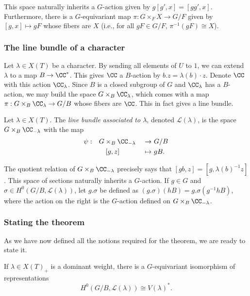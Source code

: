 This space naturally inherits a $G$-action given by $g [g', x] = [g g', x]$. Furthermore, there is a $G$-equivariant map $\pi: G \times_F X \to G/F$ given by $[g,x] \mapsto gF$ whose fibers are $X$ (i.e., for all $gF \in G/F$, $\pi^{-1}(gF) \cong X$).

\subsubsection{The line bundle of a character}
Let $\lambda \in X(T)$ be a character. By sending all elements of $U$ to $1$, we can extend $\lambda$ to a map $B \rightarrow \CC^*$. This gives $\CC$ a $B$-action by $b . z = \lambda(b) \cdot z$. Denote $\CC$ with this action $\CC_\lambda$. Since $B$ is a closed subgroup of $G$ and $\CC_\lambda$ has a $B$-action, we may build the space $G \times_B \CC_{\lambda}$, which comes with a map $\pi: G \times_B \CC_{\lambda} \to G/B$ whose fibers are $\CC$. This in fact gives a line bundle.
\begin{defn}
    Let $\lambda \in X(T)$. The \emph{line bundle associated to $\lambda$}, denoted $\mathcal{L}(\lambda)$, is the space $G \times_B \CC_{-\lambda}$ with the map
    \begin{alignat*}{4}
    \psi: \quad &G \times_B \CC_{-\lambda} &\ \to\ &G/B\\
           & \quad [g, z] &\ \mapsto\ &gB.
\end{alignat*}
\end{defn}

The quotient relation of $G \times_B \CC_{-\lambda}$ precisely says that $[g b, z] = [g, {\lambda(b)}^{-1} z]$.
This space of sections naturally inherits a $G$-action. If $g \in G$ and $\sigma \in H^{0}(G/B, \mathcal{L}(\lambda))$, let $g. \sigma$ be defined as $(g . \sigma) (h B) = g.\sigma(g^{-1}h B)$, where the action on the right is the $G$-action defined on $G \times_B \CC_{-\lambda}$. 

\subsubsection{Stating the theorem}
As we have now defined all the notions required for the theorem, we are ready to state it.

\begin{theorem}
    If $\lambda \in X(T)_+$ is a dominant weight, there is a $G$-equivariant isomorphism of representations
    \[ H^{0}(G/B, \mathcal{L}(\lambda)) \cong {V(\lambda)}^*. \]
\end{theorem}

